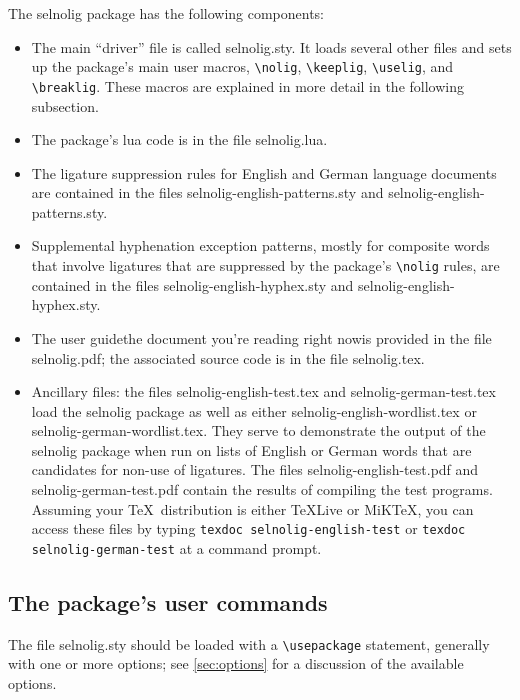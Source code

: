 \documentclass[11pt]{article}
\newcommand{\pkg}[1]{\textsf{#1}}
\newcommand{\cmmd}[1]{\texttt{\textbackslash #1}}
\begin{document}
The \pkg{selnolig} package has the following components:
\begin{itemize}
\item The main \enquote{driver} file is called \pkg{selnolig.sty}. It loads several other files and sets up the package's main user macros, \cmmd{nolig}, \cmmd{keeplig}, \cmmd{uselig}, and \cmmd{breaklig}. These macros are explained in more detail in the following subsection.
\item The package's lua code is in the file \pkg{selnolig.lua}. 
\item The ligature suppression rules for English and German language documents are contained in the files \pkg{selnolig-english-patterns.sty} and \pkg{selnolig-english-patterns.sty}. 
\item Supplemental hyphenation exception patterns, mostly for composite words that involve ligatures that are  suppressed by the package's \cmmd{nolig} rules, are contained in the files \pkg{selnolig-english-hyphex.sty} and \pkg{selnolig-english-hyphex.sty}.
\item The user guide\textemdash the document you're reading right now\textemdash is provided in the file \pkg{selnolig.pdf}; the associated source code is in the file \pkg{selnolig.tex}. 
\item Ancillary files: the files \pkg{selnolig-english-test.tex} and \pkg{selnolig-german-test.tex} load the \pkg{selnolig} package as well as either \pkg{selnolig-english-wordlist.tex} or \pkg{selnolig-german-wordlist.tex}. They serve to demonstrate the output of the \pkg{selnolig} package when run on lists of English or German words that are candidates for non-use of ligatures. The files \pkg{selnolig-english-test.pdf} and \pkg{selnolig-german-test.pdf} contain the results of compiling the test programs. 
Assuming your \TeX\ distribution is either \TeX Live or MiK\TeX, you can access these files by typing \Verb+texdoc selnolig-english-test+ or \Verb+texdoc selnolig-german-test+ at a command prompt. 

\end{itemize}


\subsection{The package's user commands} \label{sec:syntax}

The file \pkg{selnolig.sty} should be loaded with a \cmmd{usepackage} statement, generally with one or more options; see \cref{sec:options} for a discussion of the available options. 
\end{document}
